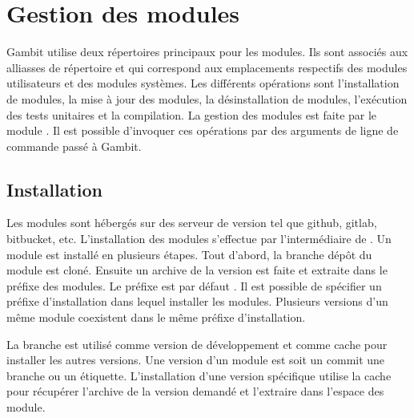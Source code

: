 \chapter{Gestion des modules}
\label{ch:module_management}

Gambit utilise deux répertoires principaux pour les modules.  Ils sont associés
aux alliasses de répertoire  et  qui
correspond aux emplacements respectifs des modules utilisateurs et des modules
systèmes. Les différents opérations sont l'installation de modules, la mise à
jour des modules, la désinstallation de modules, l'exécution des tests
unitaires et la compilation. La gestion des modules est faite par le module
. Il est possible d'invoquer ces opérations par des
arguments de ligne de commande passé à Gambit.


\section{Installation}

Les modules sont hébergés sur des serveur de version tel que github, gitlab,
bitbucket, etc. L'installation des modules s'effectue par l'intermédiaire de
. Un module est installé en plusieurs étapes. Tout d'abord, la
branche  dépôt du module est cloné. Ensuite un archive de la
version est faite et extraite dans le préfixe des modules. Le préfixe est par
défaut .  Il est possible de spécifier un préfixe
d'installation dans lequel installer les modules. Plusieurs versions d'un même
module coexistent dans le même préfixe d'installation.

La branche  est utilisé comme version de développement et
comme cache pour installer les autres versions. Une version d'un module est soit
un commit une branche ou un étiquette. L'installation d'une version
spécifique utilise la cache pour récupérer l'archive de la version demandé
et l'extraire dans l'espace des module.

